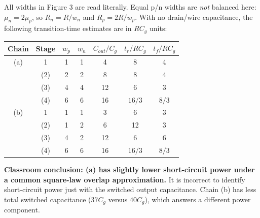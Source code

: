 \documentclass[10pt]{article}
\begin{document}
All widths in Figure 3 are read literally. Equal p/n widths are \emph{not} balanced here: $\mu_n=2\mu_p$, so $R_n=R/w_n$ and $R_p=2R/w_p$. With no drain/wire capacitance, the following transition-time estimates are in $RC_g$ units:
\begin{center}\begin{tabular}{ccccccc}\toprule Chain&Stage&$w_p$&$w_n$&$C_{out}/C_g$&$t_r/RC_g$&$t_f/RC_g$\\\midrule
(a)&1&1&1&4&8&4\\ &(2)&2&2&8&8&4\\ &(3)&4&4&12&6&3\\ &(4)&6&6&16&$16/3$&$8/3$\\\midrule
(b)&1&1&1&3&6&3\\ &(2)&1&2&6&12&3\\ &(3)&4&2&12&6&6\\ &(4)&6&6&16&$16/3$&$8/3$\\\bottomrule\end{tabular}\end{center}
\textbf{Classroom conclusion: (a) has slightly lower short-circuit power under a common square-law overlap approximation.} It is incorrect to identify short-circuit power just with the switched output capacitance. Chain (b) has less total switched capacitance ($37C_g$ versus $40C_g$), which answers a different power component.
\end{document}
